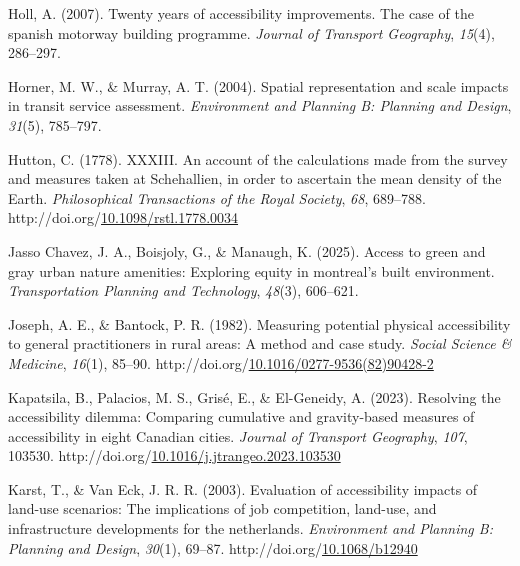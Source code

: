\documentclass[
11pt, %
oneside, %
english, %
singlespacing, %
]{macthesis} %
\newlength{\cslhangindent}
\newenvironment{CSLReferences}[2] %
{\begin{list}{}{%
	\setlength{\itemindent}{0pt}
	\setlength{\leftmargin}{0pt}
	\setlength{\parsep}{0pt}
	\ifodd #1
	\setlength{\leftmargin}{\cslhangindent}
	\setlength{\itemindent}{-1\cslhangindent}
	\fi
	\setlength{\itemsep}{#2\baselineskip}}}
{\end{list}}
\begin{document}
\begin{CSLReferences}{1}{0}
Holl, A. (2007). Twenty years of accessibility improvements. The case of the spanish motorway building programme. \emph{Journal of Transport Geography}, \emph{15}(4), 286--297.

Horner, M. W., \& Murray, A. T. (2004). Spatial representation and scale impacts in transit service assessment. \emph{Environment and Planning B: Planning and Design}, \emph{31}(5), 785--797.

Hutton, C. (1778). {XXXIII}. {An} account of the calculations made from the survey and measures taken at {Schehallien}, in order to ascertain the mean density of the {Earth}. \emph{Philosophical Transactions of the Royal Society}, \emph{68}, 689--788. http://doi.org/\href{https://doi.org/10.1098/rstl.1778.0034}{10.1098/rstl.1778.0034}

Jasso Chavez, J. A., Boisjoly, G., \& Manaugh, K. (2025). Access to green and gray urban nature amenities: Exploring equity in montreal's built environment. \emph{Transportation Planning and Technology}, \emph{48}(3), 606--621.

Joseph, A. E., \& Bantock, P. R. (1982). Measuring potential physical accessibility to general practitioners in rural areas: A method and case study. \emph{Social Science \& Medicine}, \emph{16}(1), 85--90. http://doi.org/\href{https://doi.org/10.1016/0277-9536(82)90428-2}{10.1016/0277-9536(82)90428-2}

Kapatsila, B., Palacios, M. S., Grisé, E., \& El-Geneidy, A. (2023). Resolving the accessibility dilemma: {Comparing} cumulative and gravity-based measures of accessibility in eight {Canadian} cities. \emph{Journal of Transport Geography}, \emph{107}, 103530. http://doi.org/\href{https://doi.org/10.1016/j.jtrangeo.2023.103530}{10.1016/j.jtrangeo.2023.103530}

Karst, T., \& Van Eck, J. R. R. (2003). Evaluation of accessibility impacts of land-use scenarios: The implications of job competition, land-use, and infrastructure developments for the netherlands. \emph{Environment and Planning B: Planning and Design}, \emph{30}(1), 69--87. http://doi.org/\href{https://doi.org/10.1068/b12940}{10.1068/b12940}


\end{CSLReferences}
\end{document}
